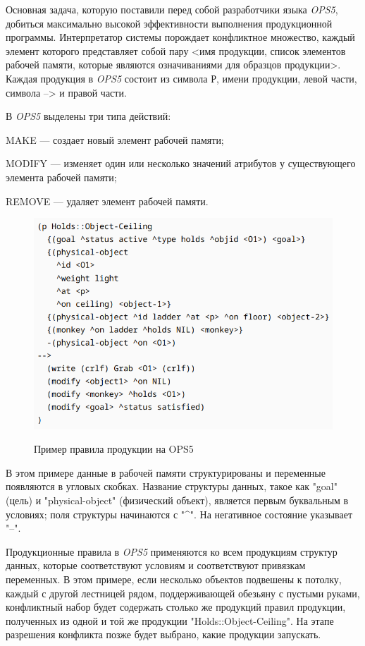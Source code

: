 Основная задача, которую поставили перед собой разработчики языка \textit{OPS5}, добиться максимально высокой эффективности выполнения про­дукционной программы. Интерпретатор системы порождает конфликт­ное множество, каждый элемент которого представляет собой пару <имя продукции, список элементов рабочей памяти, которые являются означи­ваниями для образцов продукции>. Каждая продукция в \textit{OPS5} состоит из символа Р, имени продукции, левой части, символа --> и правой части.

В \textit{OPS5} вы­делены три типа действий:
\begin{textitemize}
	\item{MAKE --- создает новый элемент рабочей памяти;}
	\item{MODIFY --- изменяет один или несколько значений атрибутов у существующего элемента рабочей памяти;}
	\item{REMOVE --- удаляет элемент рабочей памяти.}
\end{textitemize}

\begin{figure}[H]
	\caption{Пример правила продукции на OPS5}
	\includegraphics[scale=0.4]{author/part3/figures/ops5_production_rule_example.png}
	\label{fig:ops5_production_rule_example}
\end{figure}
В этом примере данные в рабочей памяти структурированы и переменные появляются в угловых скобках. Название структуры данных, такое как "goal"{} (цель) и "physical-object"{} (физический объект), является первым буквальным в условиях; поля структуры начинаются с "\textasciicircum"{}. На негативное состояние  указывает "{}--"{}.

Продукционные правила в \textit{OPS5} применяются ко всем продукциям структур данных, которые соответствуют условиям и соответствуют привязкам переменных. В этом примере, если несколько объектов подвешены к потолку, каждый с другой лестницей рядом, поддерживающей обезьяну с пустыми руками, конфликтный набор будет содержать столько же продукций правил продукции, полученных из одной и той же продукции "Holds::Object-Ceiling"{}. На этапе разрешения конфликта позже будет выбрано, какие продукции запускать.

